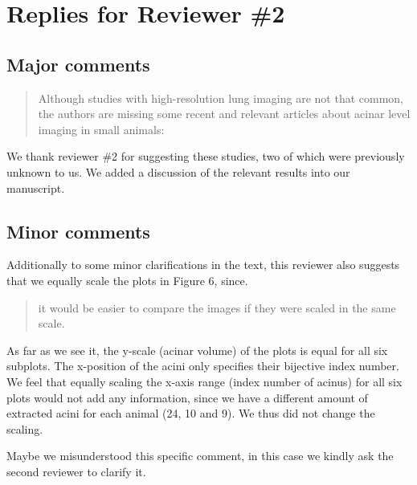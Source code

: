 \documentclass[english,paper=a4]{scrartcl}
\begin{document}
\section{Replies for Reviewer \#2}
\subsection{Major comments}
\blockquote{Although studies with high-resolution lung imaging are not that common, the authors are missing some recent and relevant articles about acinar level imaging in small animals:  \textelp{}}

We thank reviewer \#2 for suggesting these studies, two of which were previously unknown to us.
We added a discussion of the relevant results into our manuscript.

\subsection{Minor comments}
Additionally to some minor clarifications in the text, this reviewer also suggests that we equally scale the plots in Figure 6, since. 

\blockquote{it would be easier to compare the images if they were scaled in the same scale.}

As far as we see it, the y-scale (acinar volume) of the plots is equal for all six subplots.
The x-position of the acini only specifies their bijective index number.
We feel that equally scaling the x-axis range (index number of acinus) for all six plots would not add any information, since we have a different amount of extracted acini for each animal (24, 10 and 9).
We thus did not change the scaling.

Maybe we misunderstood this specific comment, in this case we kindly ask the second reviewer to clarify it.



%
\end{document}
